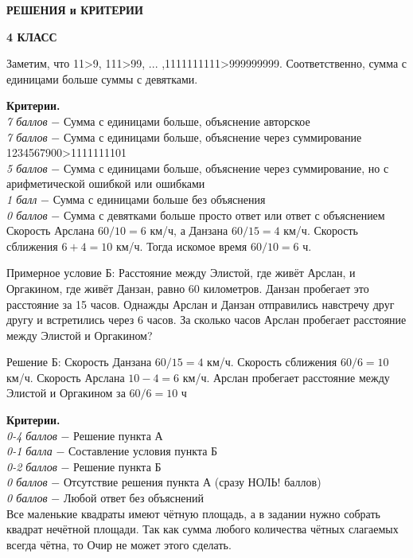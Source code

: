 \centerline{\bf \Large  РЕШЕНИЯ и КРИТЕРИИ}

\centerline{\bf \Large  4 КЛАСС}



 Заметим, что 11>9, 111>99, ... ,1111111111>999999999. Соответственно, сумма с единицами больше суммы с девятками. \par

\textbf{Критерии.} \\
\textit{7 баллов} $-$ Сумма с единицами больше, объяснение авторское\\
\textit{7 баллов} $-$ Сумма с единицами больше, объяснение через суммирование 1234567900>1111111101\\
\textit{5 баллов} $-$ Сумма с единицами больше, объяснение через суммирование, но с арифметической ошибкой или ошибками\\
\textit{1 балл} $-$  Сумма с единицами больше без объяснения\\ 
\textit{0 баллов} $-$ Сумма с девятками больше просто ответ или ответ с объяснением \\

 Скорость Арслана $60/10=6$ км/ч, а Данзана $60/15=4$ км/ч. Скорость сближения $6+4=10$ км/ч. Тогда искомое время $60/10=6$ ч.

Примерное условие Б: Расстояние между Элистой, где живёт Арслан, и Оргакином, где живёт Данзан, равно 60 километров. Данзан пробегает это расстояние за 15 часов. Однажды Арслан и Данзан отправились навстречу друг другу и встретились через 6 часов. За сколько часов Арслан пробегает расстояние между Элистой и Оргакином? 

Решение Б: Скорость Данзана $60/15=4$ км/ч. Скорость сближения $60/6=10$ км/ч. Скорость Арслана $10 - 4 = 6$ км/ч. Арслан пробегает расстояние между Элистой и Оргакином за $60/6=10$ ч\par

\textbf{Критерии.} \\
\textit{0-4 баллов} $-$ Решение пункта А\\
\textit{0-1 балла} $-$ Составление условия пункта Б \\
\textit{0-2 баллов} $-$ Решение пункта Б\\
\textit{0 баллов} $-$ Отсутствие решения пункта А (сразу НОЛЬ! баллов)\\
\textit{0 баллов} $-$ Любой ответ без объяснений\\

 Все маленькие квадраты имеют чётную площадь, а в задании нужно собрать квадрат нечётной площади. Так как сумма любого количества чётных слагаемых всегда чётна, то Очир не может этого сделать.\par

